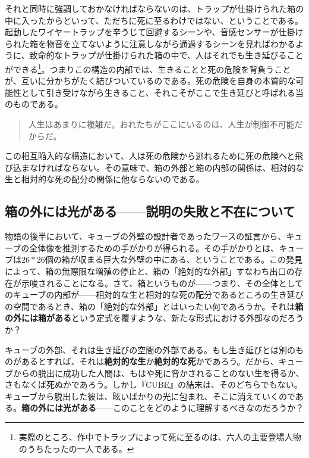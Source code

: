 \documentclass[9pt,b5j,twoside,twocolumn]{utarticle}
\begin{document}
それと同時に強調しておかなければならないのは、トラップが仕掛けられた箱の中に入ったからといって、ただちに死に至るわけではない、ということである。起動したワイヤートラップを辛うじて回避するシーンや、音感センサーが仕掛けられた箱を物音を立てないように注意しながら通過するシーンを見ればわかるように、致命的なトラップが仕掛けられた箱の中で、人はそれでも生き延びることができる\footnote{実際のところ、作中でトラップによって死に至るのは、六人の主要登場人物のうちたったの一人である。}。つまりこの構造の内部では、生きることと死の危険を背負うことが、互いに分かちがたく結びついているのである。死の危険を自身の本質的な可能性として引き受けながら生きること、それこそがここで生き延びと呼ばれる当のものである。

\begin{quote}
人生はあまりに複雑だ。おれたちがここにいるのは、人生が制御不可能だからだ。
\end{quote}

この相互陥入的な構造において、人は死の危険から逃れるために死の危険へと飛び込まなければならない。その意味で、箱の外部と箱の内部の関係は、相対的な生と相対的な死の配分の関係に他ならないのである。

\subsection{\tbaselineshift =3.0pt 箱の外には光がある------説明の失敗と不在について}

物語の後半において、キューブの外壁の設計者であったワースの証言から、キューブの全体像を推測するための手がかりが得られる。その手がかりとは、キューブは$26*26$個の箱が収まる巨大な外壁の中にある、ということである。この発見によって、箱の無際限な増殖の停止と、箱の「絶対的な外部」すなわち出口の存在が示唆されることになる。さて、箱というものが------つまり、その全体としてのキューブの内部が------相対的な生と相対的な死の配分であるところの生き延びの空間であるとき、箱の「絶対的な外部」とはいったい何であろうか。それは\textbf{箱の外には箱がある}という定式を覆すような、新たな形式における外部なのだろうか？

キューブの外部、それは生き延びの空間の外部である。もし生き延びとは別のものがあるとすれば、それは\textbf{絶対的な生}か\textbf{絶対的な死}かであろう。だから、キューブからの脱出に成功した人間は、もはや死に脅かされることのない生を得るか、さもなくば死ぬかであろう。しかし『CUBE』の結末は、そのどちらでもない。キューブから脱出した彼は、眩いばかりの光に包まれ、そこに消えていくのである。\textbf{箱の外には光がある}------このことをどのように理解するべきなのだろうか？
\end{document}
